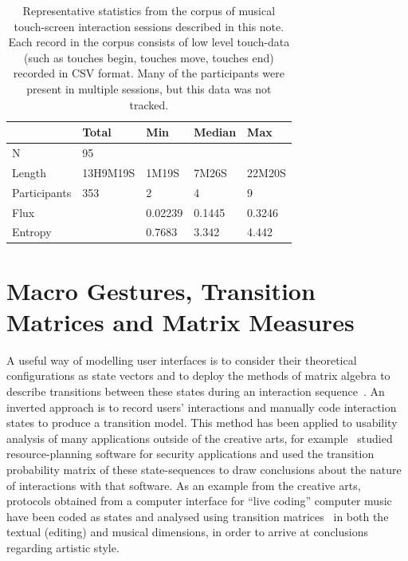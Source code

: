 \documentclass{sigchi}
\begin{document}
\begin{table}
\centering
\begin{tabular}{l|llll}
\hline
            & Total & Min  & Median   & Max     \\ 
\hline
N           & 95    &      &          &         \\
Length & 13H9M19S & 1M19S & 7M26S & 22M20S \\
Participants& 353   & 2    & 4        & 9        \\
Flux &   & 0.02239 & 0.1445 & 0.3246\\
Entropy &   & 0.7683 & 3.342 & 4.442\\          
\hline
\end{tabular}
\caption{
  Representative statistics from the corpus of musical touch-screen
  interaction sessions described in this note.  Each record in the corpus
  consists of low level touch-data (such as touches begin, touches move, touches end) recorded in CSV format. 
  Many of the participants were
  present in multiple sessions, but this data was not tracked.\label{corpus-table}}
\end{table}

\section{Macro Gestures, Transition Matrices and Matrix Measures}

A useful way of modelling user interfaces is to consider their
theoretical configurations as state vectors and to deploy the methods
of matrix algebra to describe transitions between these states during
an interaction sequence~\cite{Thimbleby:2001kq, Thimbleby:2004fj}. An
inverted approach is to record users' interactions and manually code
interaction states to produce a transition model. This method has been
applied to usability analysis of many applications outside of the creative arts, for example~\cite{Kannampallil:2007fp}
studied resource-planning software for
security applications and used the transition
probability matrix of these state-sequences to draw
conclusions about the nature of interactions with that software. As an example from the creative
arts, protocols obtained from a computer interface for ``live coding''
computer music have been  coded as states and analysed using
transition matrices~\cite{Swift:2014tya} in both the textual (editing) and
musical dimensions, in order to arrive at conclusions regarding
artistic style.
\end{document}
